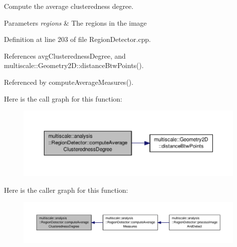 Compute the average clusteredness degree. 


\begin{DoxyParams}{Parameters}
{\em regions} & The regions in the image \\
\hline
\end{DoxyParams}


Definition at line 203 of file Region\-Detector.\-cpp.



References avg\-Clusteredness\-Degree, and multiscale\-::\-Geometry2\-D\-::distance\-Btw\-Points().



Referenced by compute\-Average\-Measures().



Here is the call graph for this function\-:
\nopagebreak
\begin{figure}[H]
\begin{center}
\leavevmode
\includegraphics[width=350pt]{classmultiscale_1_1analysis_1_1RegionDetector_a5ad71a8af2beb1a02573d0c125af4e16_cgraph}
\end{center}
\end{figure}




Here is the caller graph for this function\-:
\nopagebreak
\begin{figure}[H]
\begin{center}
\leavevmode
\includegraphics[width=350pt]{classmultiscale_1_1analysis_1_1RegionDetector_a5ad71a8af2beb1a02573d0c125af4e16_icgraph}
\end{center}
\end{figure}


